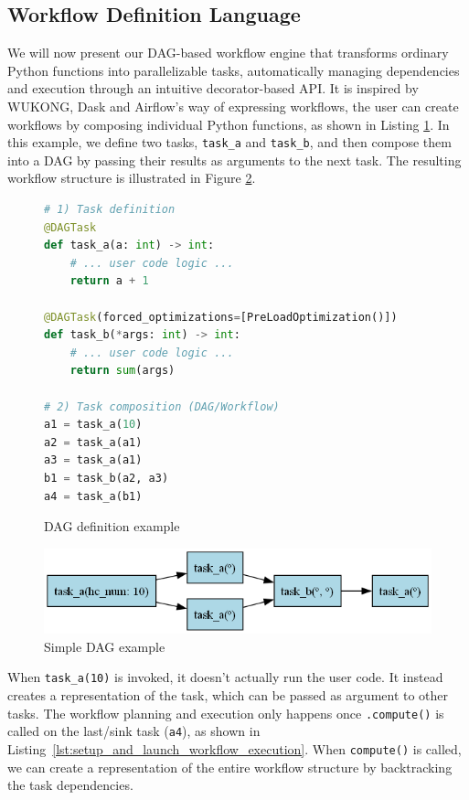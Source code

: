 \documentclass[conference]{IEEEtran}
\begin{document}
\subsection{Workflow Definition Language}
\label{ss:workflow_definition_language}

We will now present our DAG-based workflow engine that transforms ordinary Python functions into parallelizable tasks, automatically managing dependencies and execution through an intuitive decorator-based API. It is inspired by WUKONG, Dask and Airflow's way of expressing workflows, the user can create workflows by composing individual Python functions, as shown in Listing \ref{lst:dag_lang_example}. In this example, we define two tasks, \texttt{task\_a} and \texttt{task\_b}, and then compose them into a DAG by passing their results as arguments to the next task. The resulting workflow structure is illustrated in Figure \ref{fig:dag_lang_example}.

\begin{figure}[h]
\centering
\begin{lstlisting}[language=Python, basicstyle=\ttfamily\footnotesize, columns=fullflexible, breaklines=true]
# 1) Task definition
@DAGTask
def task_a(a: int) -> int:
    # ... user code logic ...
    return a + 1

@DAGTask(forced_optimizations=[PreLoadOptimization()])
def task_b(*args: int) -> int:
    # ... user code logic ...
    return sum(args)

# 2) Task composition (DAG/Workflow)
a1 = task_a(10)
a2 = task_a(a1)
a3 = task_a(a1)
b1 = task_b(a2, a3)
a4 = task_a(b1)
\end{lstlisting}
\caption{DAG definition example}
\label{lst:dag_lang_example}
\end{figure}

\begin{figure}[h]
    \centering
    \includegraphics[width=\columnwidth]{figures/dag_lang_example.png}
    \caption{Simple DAG example}
    \label{fig:dag_lang_example}
\end{figure}

When \texttt{task\_a(10)} is invoked, it doesn't actually run the user code. It instead creates a representation of the task, which can be passed as argument to other tasks. The workflow planning and execution only happens once \texttt{.compute()} is called on the last/sink task (\texttt{a4}), as shown in Listing~\ref{lst:setup_and_launch_workflow_execution}. When \texttt{compute()} is called, we can create a representation of the entire workflow structure by backtracking the task dependencies.
\end{document}
